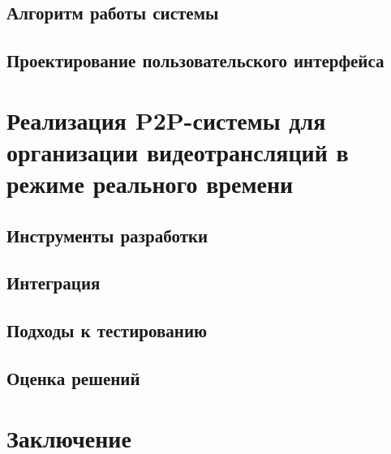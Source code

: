 	\subsection{Алгоритм работы системы}
	\subsection{Проектирование пользовательского интерфейса}

\section{Реализация P2P-системы для организации видеотрансляций в режиме реального времени}
	\subsection{Инструменты разработки}
	\subsection{Интеграция}
	\subsection{Подходы к тестированию}
	\subsection{Оценка решений}

\section*{Заключение}


% 
% 

